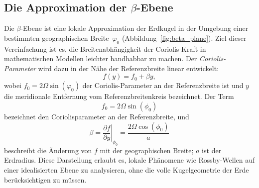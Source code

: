 \subsection{Die Approximation der \(\beta\)-Ebene }

Die \(\beta\)-Ebene ist eine lokale Approximation der Erdkugel in der Umgebung
einer bestimmten geographischen Breite~\(\varphi_0\)
(Abbildung~\ref{fig:beta_plane}). Ziel dieser Vereinfachung ist es, die
Breitenabhängigkeit der Coriolis-Kraft in mathematischen Modellen leichter
handhabbar zu machen. Der \emph{Coriolis-Parameter} wird dazu in der Nähe der
Referenzbreite linear entwickelt:
\begin{equation}
	f(y) = f_0 + \beta y,
	\label{rossby:eq:beta_plane}
\end{equation}
wobei $f_0 = 2 \Omega \sin(\varphi_0)$ der Coriolis-Parameter an der
Referenzbreite ist und $y$ die meridionale Entfernung vom
Referenzbreitenkreis bezeichnet.
Der Term
\begin{equation}
	f_0 = 2\Omega \sin(\phi_0)
	\label{rossby:eq:coriolis_parameter_ref}
\end{equation}
bezeichnet den Coriolisparameter an der Referenzbreite, und
\begin{equation}
	\beta = \left.\frac{\partial f}{\partial y}\right|_{\phi_0} = \frac{2\Omega \cos(\phi_0)}{a}
	\label{rossby:eq:beta_parameter_ref}
\end{equation}
beschreibt die Änderung von $f$ mit der geographischen Breite; $a$ ist der
Erdradius. Diese Darstellung erlaubt es, lokale Phänomene wie Rossby-Wellen auf
einer idealisierten Ebene zu analysieren, ohne die volle Kugelgeometrie der
Erde berücksichtigen zu müssen.

